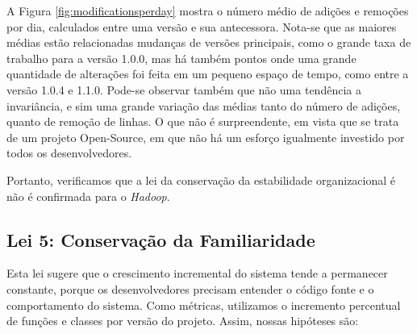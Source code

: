 A Figura \ref{fig:modificationsperday} mostra o número médio de adições e remoções por dia, calculados entre uma versão e sua antecessora. Nota-se que as maiores médias estão relacionadas mudanças de versões principais, como o grande taxa de trabalho para a versão 1.0.0, mas há também pontos onde uma grande quantidade de alterações foi feita em um pequeno espaço de tempo, como entre a versão 1.0.4 e 1.1.0. Pode-se observar também que não uma tendência a invariância, e sim uma grande variação das médias tanto do número de adições, quanto de remoção de linhas. O que não é surpreendente, em vista que se trata de um projeto Open-Source, em que não há um esforço igualmente investido por todos os desenvolvedores.

Portanto, verificamos que a lei da conservação da estabilidade organizacional é não é confirmada para o \textit{Hadoop}.
\subsection{Lei 5: Conservação da Familiaridade}
Esta lei sugere que o crescimento incremental do sistema tende a permanecer constante, porque os desenvolvedores precisam entender o código fonte e o comportamento do sistema. Como métricas, utilizamos o incremento percentual de funções e classes por versão do projeto. Assim, nossas hipóteses são:

